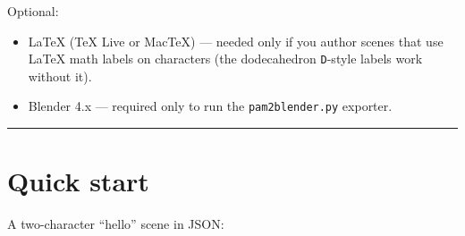 \documentclass[
  12pt,
  letterpaper,
]{book}
\providecommand{\tightlist}{%
  \setlength{\itemsep}{0pt}\setlength{\parskip}{0pt}}
\begin{document}
Optional:

\begin{itemize}
\tightlist
\item
  LaTeX (TeX Live or MacTeX) --- needed only if you author scenes that
  use LaTeX math labels on characters (the dodecahedron \texttt{D}-style
  labels work without it).
\item
  Blender 4.x --- required only to run the \texttt{pam2blender.py}
  exporter.
\end{itemize}

\begin{center}\rule{0.5\linewidth}{0.5pt}\end{center}

\section{Quick start}\label{quick-start}

A two-character ``hello'' scene in JSON:
\end{document}
